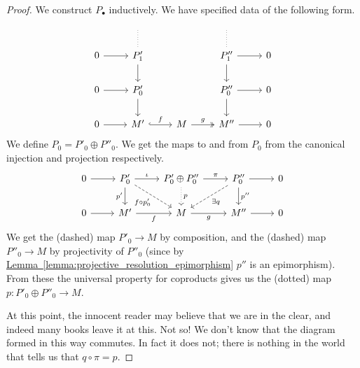 \documentclass[main.tex]{subfiles}
\begin{document}
\begin{proof}
  We construct $P_{\bullet}$ inductively. We have specified data of the following form.
  \begin{equation*}
    \begin{tikzcd}
      \
      & \
      \arrow[d, dotted, no head]
      & \
      & \
      \arrow[d, dotted, no head]
      & \
      \\
      0
      \arrow[r]
      & P'_{1}
      \arrow[d]
      && P''_{1}
      \arrow[r]
      \arrow[d]
      & 0
      \\
      0
      \arrow[r]
      & P'_{0}
      \arrow[d]
      && P''_{0}
      \arrow[r]
      \arrow[d]
      & 0
      \\
      0
      \arrow[r]
      & M'
      \arrow[r, hook, "f"]
      & M
      \arrow[r, two heads, "g"]
      & M''
      \arrow[r]
      & 0
    \end{tikzcd}
  \end{equation*}
  We define $P_{0} = P'_{0} \oplus P''_{0}$. We get the maps to and from $P_{0}$ from the canonical injection and projection respectively.
  \begin{equation*}
    \begin{tikzcd}
      0
      \arrow[r]
      & P'_{0}
      \arrow[r, "\iota"]
      \arrow[dr, dashed, swap, "f \circ p'_{0}"]
      \arrow[d, swap, "p'"]
      & P'_{0} \oplus P''_{0}
      \arrow[r, "\pi"]
      \arrow[d, dotted, "p"]
      & P''_{0}
      \arrow[r]
      \arrow[d, "p''"]
      \arrow[dl, dashed, "\exists q"]
      & 0
      \\
      0
      \arrow[r]
      & M'
      \arrow[r, swap, "f"]
      & M
      \arrow[r, swap, "g"]
      & M''
      \arrow[r]
      & 0
    \end{tikzcd}
  \end{equation*}
  We get the (dashed) map $P'_{0} \to M$ by composition, and the (dashed) map $P''_{0} \to M$ by projectivity of $P''_{0}$ (since by \hyperref[lemma:projective_resolution_epimorphism]{Lemma~\ref*{lemma:projective_resolution_epimorphism}} $p''$ is an epimorphism). From these the universal property for coproducts gives us the (dotted) map $p\colon P'_{0} \oplus P''_{0} \to M$.

  At this point, the innocent reader may believe that we are in the clear, and indeed many books leave it at this. Not so! We don't know that the diagram formed in this way commutes. In fact it does not; there is nothing in the world that tells us that $q \circ \pi = p$.


\end{proof}
\end{document}

